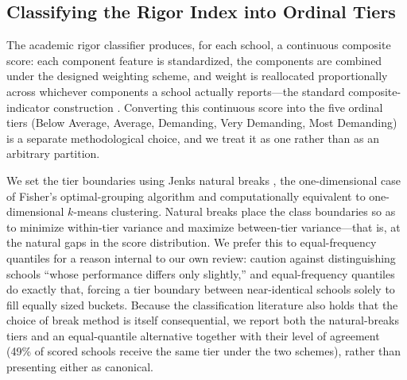 %
%

\subsection{Classifying the Rigor Index into Ordinal Tiers}\label{sec:tiering}

The academic rigor classifier produces, for each school, a continuous composite score: each
component feature is standardized, the components are combined under the designed weighting
scheme, and weight is reallocated proportionally across whichever components a school actually
reports---the standard composite-indicator construction \citep{nardo2008}. Converting this
continuous score into the five ordinal tiers (Below Average, Average, Demanding, Very Demanding,
Most Demanding) is a separate methodological choice, and we treat it as one rather than as an
arbitrary partition.

We set the tier boundaries using Jenks natural breaks \citep{jenks1967}, the one-dimensional case
of Fisher's optimal-grouping algorithm \citep{fisher1958} and computationally equivalent to
one-dimensional $k$-means clustering. Natural breaks place the class boundaries so as to minimize
within-tier variance and maximize between-tier variance---that is, at the natural gaps in the
score distribution. We prefer this to equal-frequency quantiles for a reason internal to our own
review: \citet{ho2020} caution against distinguishing schools ``whose performance differs only
slightly,'' and equal-frequency quantiles do exactly that, forcing a tier boundary between
near-identical schools solely to fill equally sized buckets. Because the classification literature
also holds that the choice of break method is itself consequential, we report both the
natural-breaks tiers and an equal-quantile alternative together with their level of agreement
(49\% of scored schools receive the same tier under the two schemes), rather than presenting
either as canonical.

